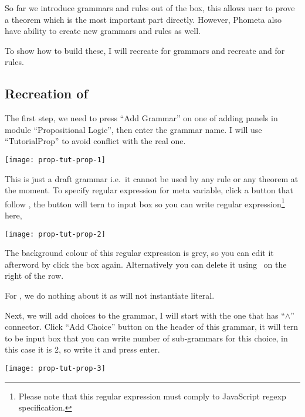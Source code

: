 \documentclass[master.tex]{subfiles}
\begin{document}
So far we introduce grammars and rules out of the box, this allows user to prove
a theorem which is the most important part directly. However, Phometa also have
ability to create new grammars and rules as well.

To show how to build these, I will recreate  for grammars and
recreate  and  for rules.

\subsection{Recreation of }

The first step, we need to press ``Add Grammar'' on one of adding panels in
module ``Propositional Logic'', then enter the grammar name. I will use
``TutorialProp'' to avoid conflict with the real one.

\begin{center}
  \texttt{[image: prop-tut-prop-1]}
\end{center}

This is just a draft grammar i.e.\ it cannot be used by any rule or any theorem
at the moment. To specify regular expression for meta variable, click a button
that follow \kMetaVarRegex, the button will tern to input box so you can write
regular expression\footnote{Please note that this regular expression must comply to
JavaScript regexp specification.} here,

\begin{center}
  \texttt{[image: prop-tut-prop-2]}
\end{center}

The background colour of this regular expression is grey, so you can edit it
afterword by click the box again. Alternatively you can delete it using
\closeButton\ on the right of the row.

For \kLiteralRegex, we do nothing about it as  will not
instantiate literal.

Next, we will add choices to the grammar, I will start with the one that has
``$\wedge$'' connector. Click ``Add Choice'' button on the header of this
grammar, it will tern to be input box that you can write number of sub-grammars
for this choice, in this case it is 2, so write it and press enter.

\begin{center}
  \texttt{[image: prop-tut-prop-3]}
\end{center}
\end{document}

